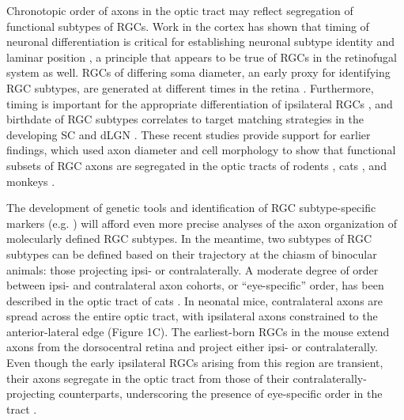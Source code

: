 Chronotopic order of axons in the optic tract may reflect segregation of functional subtypes of RGCs.
Work in the cortex has shown that timing of neuronal differentiation is critical for establishing neuronal subtype identity and laminar position \cite{molyneaux2007neuronal}, a principle that appears to be true of RGCs in the retinofugal system as well.
RGCs of differing soma diameter, an early proxy for identifying RGC subtypes, are generated at different times in the retina \cite{rapaport1995spatiotemporal,reese1994birthdates}.
Furthermore, timing is important for the appropriate differentiation of ipsilateral RGCs \cite{bhansali2014delayed}, and birthdate of RGC subtypes correlates to target matching strategies in the developing SC and dLGN \cite{osterhout2014birthdate}.
These recent studies provide support for earlier findings, which used axon diameter and cell morphology to show that functional subsets of RGC axons are segregated in the optic tracts of rodents \cite{reese1987distributionrat}, cats \cite{guillery1982arrangement,torrealba1982studies}, and monkeys \cite{reese1990fibre}.

The development of genetic tools and identification of RGC subtype-specific markers (e.g. \cite{blackshaw2004genomic,dhande2014retinal}) will afford even more precise analyses of the axon organization of molecularly defined RGC subtypes.
In the meantime, two subtypes of RGC subtypes can be defined based on their trajectory at the chiasm of binocular animals: those projecting ipsi- or contralaterally.
A moderate degree of order between ipsi- and contralateral axon cohorts, or “eye-specific” order, has been described in the optic tract of cats \cite{torrealba1982studies}.
In neonatal mice, contralateral axons are spread across the entire optic tract, with ipsilateral axons constrained to the anterior-lateral edge \cite{godement1984prenatal} (Figure 1C). %
The earliest-born RGCs in the mouse extend axons from the dorsocentral retina and project either ipsi- or contralaterally.
Even though the early ipsilateral RGCs arising from this region are transient, their axons segregate in the optic tract from those of their contralaterally-projecting counterparts, underscoring the presence of eye-specific order in the tract \cite{soares2015transient}.

